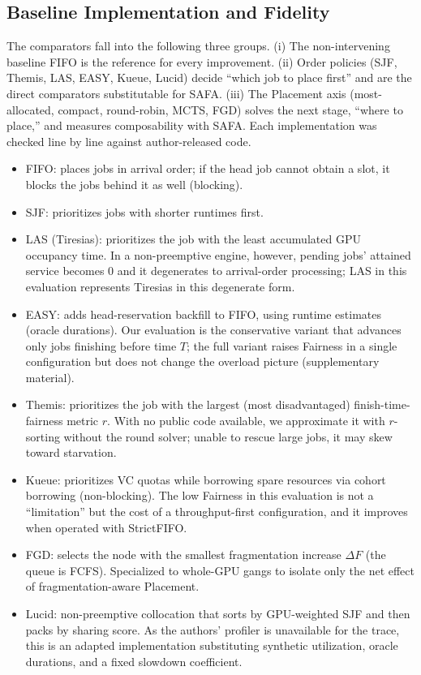 \documentclass{ieeetj}
\begin{document}
\subsection{Baseline Implementation and Fidelity}\label{eval:impl}
The comparators fall into the following three groups. (i) The non-intervening baseline FIFO is the reference for every improvement. (ii) Order policies (SJF, Themis, LAS, EASY, Kueue, Lucid) decide ``which job to place first'' and are the direct comparators substitutable for SAFA. (iii) The Placement axis (most-allocated, compact, round-robin, MCTS, FGD) solves the next stage, ``where to place,'' and measures composability with SAFA. Each implementation was checked line by line against author-released code.
\begin{itemize}
\item FIFO: places jobs in arrival order; if the head job cannot obtain a slot, it blocks the jobs behind it as well (blocking).
\item SJF: prioritizes jobs with shorter runtimes first.
\item LAS (Tiresias): prioritizes the job with the least accumulated GPU occupancy time. In a non-preemptive engine, however, pending jobs' attained service becomes 0 and it degenerates to arrival-order processing; LAS in this evaluation represents Tiresias in this degenerate form.
\item EASY: adds head-reservation backfill to FIFO, using runtime estimates (oracle durations). Our evaluation is the conservative variant that advances only jobs finishing before time $T$; the full variant raises Fairness in a single configuration but does not change the overload picture (supplementary material).
\item Themis: prioritizes the job with the largest (most disadvantaged) finish-time-fairness metric $r$. With no public code available, we approximate it with $r$-sorting without the round solver; unable to rescue large jobs, it may skew toward starvation.
\item Kueue: prioritizes VC quotas while borrowing spare resources via cohort borrowing (non-blocking). The low Fairness in this evaluation is not a ``limitation'' but the cost of a throughput-first configuration, and it improves when operated with StrictFIFO.
\item FGD: selects the node with the smallest fragmentation increase $\Delta F$ (the queue is FCFS). Specialized to whole-GPU gangs to isolate only the net effect of fragmentation-aware Placement.
\item Lucid: non-preemptive collocation that sorts by GPU-weighted SJF and then packs by sharing score. As the authors' profiler is unavailable for the trace, this is an adapted implementation substituting synthetic utilization, oracle durations, and a fixed slowdown coefficient.
\end{itemize}
\end{document}
